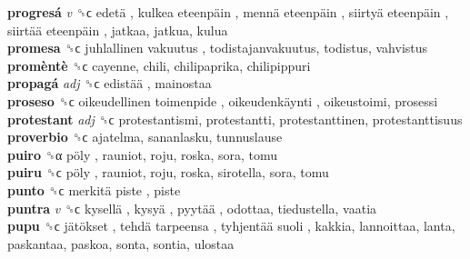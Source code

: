 \textbf{progresá} \emph{v}  ␝ϲ   edetä ,  kulkea eteenpäin ,  mennä eteenpäin ,  siirtyä eteenpäin ,  siirtää eteenpäin , jatkaa, jatkua, kulua  \\
\textbf{promesa} ␝ϲ   juhlallinen vakuutus , todistajanvakuutus, todistus, vahvistus  \\
\textbf{promèntè} ␝ϲ  cayenne, chili, chilipaprika, chilipippuri  \\
\textbf{propagá} \emph{adj}  ␝ϲ   edistää , mainostaa  \\
\textbf{proseso} ␝ϲ   oikeudellinen toimenpide ,  oikeudenkäynti , oikeustoimi, prosessi  \\
\textbf{protestant} \emph{adj}  ␝ϲ  protestantismi, protestantti, protestanttinen, protestanttisuus  \\
\textbf{proverbio} ␝ϲ  ajatelma, sananlasku, tunnuslause  \\
\textbf{puiro} ␝α   pöly , rauniot, roju, roska, sora, tomu  \\
\textbf{puiru} ␝ϲ   pöly , rauniot, roju, roska, sirotella, sora, tomu  \\
\textbf{punto} ␝ϲ   merkitä piste , piste  \\
\textbf{puntra} \emph{v}  ␝ϲ   kysellä ,  kysyä ,  pyytää , odottaa, tiedustella, vaatia  \\
\textbf{pupu} ␝ϲ   jätökset ,  tehdä tarpeensa ,  tyhjentää suoli , kakkia, lannoittaa, lanta, paskantaa, paskoa, sonta, sontia, ulostaa  \\
